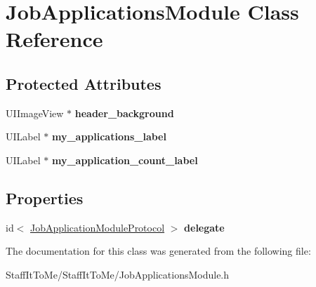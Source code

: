 \hypertarget{interface_job_applications_module}{
\section{\-Job\-Applications\-Module \-Class \-Reference}
\label{interface_job_applications_module}
}
\subsection*{\-Protected \-Attributes}
\begin{DoxyCompactItemize}
\item 
\hypertarget{interface_job_applications_module_a5fe6b69e4edd3db83bc30f6cae89b7e8}{
\-U\-I\-Image\-View $\ast$ {\bfseries header\-\_\-background}}
\label{interface_job_applications_module_a5fe6b69e4edd3db83bc30f6cae89b7e8}

\item 
\hypertarget{interface_job_applications_module_a672fe857f6c730187f853d3c12a8800e}{
\-U\-I\-Label $\ast$ {\bfseries my\-\_\-applications\-\_\-label}}
\label{interface_job_applications_module_a672fe857f6c730187f853d3c12a8800e}

\item 
\hypertarget{interface_job_applications_module_ab1be5eac39a23244cac1b5920a496115}{
\-U\-I\-Label $\ast$ {\bfseries my\-\_\-application\-\_\-count\-\_\-label}}
\label{interface_job_applications_module_ab1be5eac39a23244cac1b5920a496115}

\end{DoxyCompactItemize}
\subsection*{\-Properties}
\begin{DoxyCompactItemize}
\item 
\hypertarget{interface_job_applications_module_ab71b1cd297fb5fca34a4d6f73cb42324}{
id$<$ \hyperlink{protocol_job_application_module_protocol-p}{\-Job\-Application\-Module\-Protocol} $>$ {\bfseries delegate}}
\label{interface_job_applications_module_ab71b1cd297fb5fca34a4d6f73cb42324}

\end{DoxyCompactItemize}


\-The documentation for this class was generated from the following file\-:\begin{DoxyCompactItemize}
\item 
\-Staff\-It\-To\-Me/\-Staff\-It\-To\-Me/\-Job\-Applications\-Module.\-h\end{DoxyCompactItemize}

